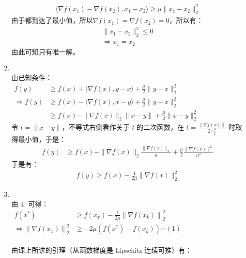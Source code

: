 \documentclass[11pt,letter,notitlepage]{article}
\begin{document}
\begin{solution}
\begin{enumerate}
\begin{align*}
            \langle\nabla f(x_1)-\nabla f(x_2), x_1-x_2\rangle \geqslant \mu\|x_1-x_2\|_{2}^{2}
        \end{align*}
        由于都到达了最小值，所以$\nabla f(x_1) = \nabla f(x_2) = 0$，所以有：\\
        \begin{align*}
            \|x_1-x_2\|_{2}^{2} \leq 0\\
            \Rightarrow x_1 = x_2
        \end{align*}
        由此可知只有唯一解。
        \item \ \\由已知条件：\\
        $ \begin{aligned} f(y) & \geqslant f(x)+\langle\nabla f(x), y-x\rangle+\frac{\mu}{2}\|y-x\|_{2}^{2} \\ \Rightarrow f(y) & \geqslant f(x) - \langle\nabla f(x), x-y\rangle+\frac{\mu}{2}\|y-x\|_{2}^{2} \\ & \geqslant f(x)-\|\nabla f(x)\|_{2}\|x-y\|+\frac{\mu}{2}\|x - y\|_{2}^{2}  \end{aligned} $\\
        令 $t = \|x - y \|$，不等式右侧看作关于 $t$ 的二次函数，在 $t= \frac{\|\nabla f(x)\|}{2 \cdot \frac{\mu}{2}}$ 时取得最小值，于是：\\
        \begin{align*}
            f(y) &\geqslant f(x)-\|\nabla f(x)\|_{2} \frac{\|\nabla f(x)\|_{2}}{\mu}+\frac{\mu}{2} \frac{\|\nabla f(x)\|^{2}}{\mu^{2}}
        \end{align*}
        于是有：\\
        \begin{align*}
            f(y) \geqslant f(x)-\frac{1}{2 \mu}\|\nabla f(x)\|_{2}^{2}
        \end{align*}
        \item \ \\
        由 4. 可得：\\
        $\begin{aligned} f\left(x^{*}\right) & \geqslant f\left(x_{x}\right)-\frac{1}{2 \mu}\left\|\nabla f\left(x_{k}\right)\right\|_{2}^{2} \\ \Rightarrow\left\|\nabla f\left(x_{x}\right)\right\|_{2}^{2} & \geqslant -2 \mu\left(f\left(x^{*}\right)-f\left(x_{k}\right)\right) \cdots (1)  \end{aligned}$\\ \ \\
        由课上所讲的引理（从函数梯度是 Lipschitz 连续可推）有：

\end{enumerate}
\end{solution}
\end{document}
